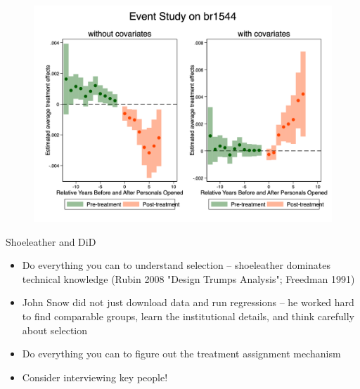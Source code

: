 \documentclass{beamer}
\begin{document}
\begin{frame}

\begin{figure}
    \centering
    \includegraphics[height=0.95\textheight]{./lecture_includes/es_br1544_combined.png}
\end{figure}

\end{frame}

\begin{frame}{Shoeleather and DiD}

\begin{itemize}

\item Do everything you can to understand selection -- shoeleather dominates technical knowledge (Rubin 2008 "Design Trumps Analysis"; Freedman 1991)
\item John Snow did not just download data and run regressions -- he worked hard to find comparable groups, learn the institutional details, and think carefully about selection
\item Do everything you can to figure out the treatment assignment mechanism 
\item Consider interviewing key people!
\end{itemize}

\end{frame}
\end{document}
